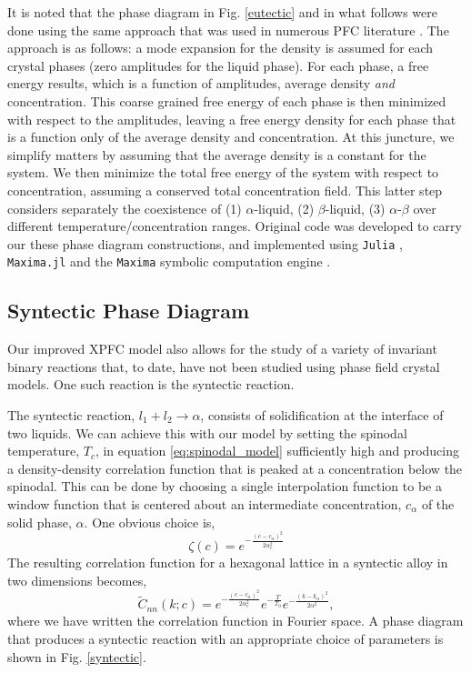 \documentclass[showkeys, prb, reprint]{revtex4-1}
\newcommand{\f}{\frac}          %
\begin{document}
It is noted that the phase diagram in Fig. \ref{eutectic} and in what follows
were done using the same approach that was used in numerous PFC literature
\cite{GREENWOOD11_BINARY}. The approach is as follows: a mode expansion for the density is assumed for each crystal phases (zero amplitudes for the liquid
phase). For each  phase, a free energy results, which 
is a function of amplitudes, average density {\it and} concentration. This
coarse grained free energy of each phase is then minimized with respect to the
amplitudes, leaving a free energy density for each phase that is a function
only of the average density and concentration. At this juncture, we simplify
matters by assuming that the average density is a constant for the system. We
then minimize the total free energy of the system with respect to
concentration, assuming a conserved total concentration field. This latter step
considers separately the coexistence of  (1) $\alpha$-liquid, (2)
$\beta$-liquid, (3) $\alpha$-$\beta$ over different temperature/concentration
ranges. Original code was developed to carry our these phase diagram
constructions, and implemented using \texttt{Julia} \cite{JULIA},
\texttt{Maxima.jl} \cite{MAXIMAJL} and the \texttt{Maxima} symbolic computation
engine \cite{MAXIMA}.  

\subsection{Syntectic Phase Diagram} %

Our improved XPFC model also allows for the study of a variety of invariant
binary reactions that, to date, have not been studied using phase field crystal
models. One such reaction is the syntectic reaction. 

The syntectic reaction, $l_1 + l_2 \rightarrow \alpha $, consists of
solidification at the interface of two liquids. We can achieve this with our
model by setting the spinodal temperature, $T_c$, in equation
\ref{eq:spinodal_model} sufficiently high and producing a density-density
correlation function that is peaked at a concentration below the spinodal. This
can be done by choosing a single interpolation function to be a window 
function that is centered about an intermediate concentration, $c_\alpha$ of 
the solid phase, $\alpha$. One obvious choice is, 
%
\begin{equation}
  \zeta(c) = e^{- \f{(c - c_\alpha)^2}{2 \alpha_c^2}}
\end{equation}
%
The resulting correlation function for a hexagonal lattice in a syntectic alloy
in two dimensions becomes, 
%
\begin{equation}
  \tilde{C}_{nn}(k; c) = 
    e^{-\f{(c - c_\alpha)^2}{2 \alpha_c^2}}
    e^{-\f{T}{T_0}} 
    e^{-\f{(k - k_\alpha)^2}{2\alpha^2}},
\end{equation}
%
where we have written the correlation function in Fourier space. A phase diagram that produces a syntectic reaction with an appropriate choice
of parameters is shown in Fig. \ref{syntectic}.
\end{document}
